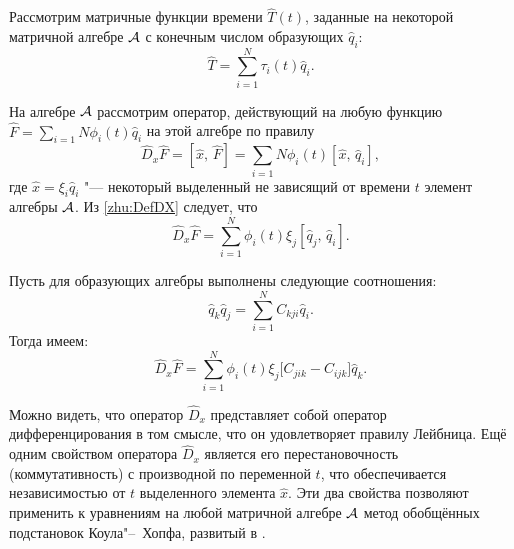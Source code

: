 \smallskip

    Рассмотрим матричные функции времени $\hat{T}(t)$, заданные на некоторой матричной алгебре $\cal A$
    с конечным числом образующих $\hat{q}_i$:
    \begin{equation}
    \label{zhu:DefT}
         \hat{T} = \sum\limits_{i=1}^N \tau_i(t)\hat{q}_i.
    \end{equation}

    На алгебре $\cal A$ рассмотрим оператор,
    действующий на любую функцию $\hat{F} =\sum_{i=1} N \phi_i(t)\hat{q}_i$ на этой алгебре
    по правилу
    \begin{equation}
    \label{zhu:DefDX}
        \hat{D}_x\hat{F} = [\hat{x},\, \hat{F}] = \sum\limits_{i=1} N
        \phi_i(t) [\hat{x},\,\hat{q}_i],
    \end{equation}
    где $\hat{x}=\xi_i \hat{q}_i$ "--- некоторый выделенный не зависящий от
    времени $t$ элемент алгебры $\cal A$. Из \eqref{zhu:DefDX} следует, что
    $$
        \hat{D}_x \hat{F} = \sum\limits_{i=1}^N
        \phi_i(t)\xi_j[\hat{q}_j,\,\hat{q}_i].
    $$

    Пусть для образующих алгебры выполнены следующие соотношения:
    $$
        \hat{q}_k \hat{q}_j = \sum\limits_{i=1}^N C_{kji}\hat{q}_i.
    $$
    Тогда имеем:
    $$
        \hat{D}_x\hat{F} =  \sum\limits_{i=1}^N
        \phi_i(t)\xi_j \Big[C_{jik}-C_{ijk}\Big]\hat{q}_k.
    $$

    Можно видеть, что оператор $\hat{D}_x$ представляет собой
    оператор дифференцирования в том смысле, что он удовлетворяет
    правилу Лейбница. Ещё одним свойством оператора $\hat{D}_x$ является его
    перестановочность (коммутативность) с производной по переменной
    $t$, что обеспечивается независимостью от $t$ выделенного
    элемента $\hat{x}$. Эти два свойства позволяют применить к уравнениям на любой матричной алгебре $\cal A$ метод обобщённых подстановок  Коула"--~Хопфа, развитый в
    \cite{zhu:ZhTMF09}.

